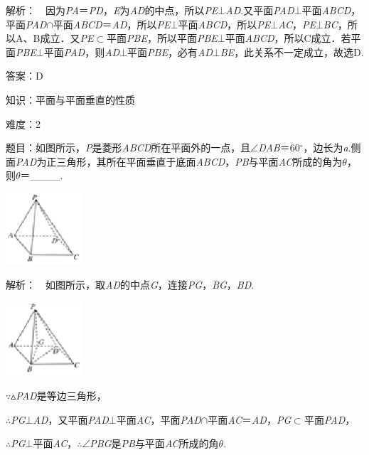 \documentclass{article} %
\begin{document}
解析：　因为\textit{PA}＝\textit{PD}，\textit{E}为\textit{AD}的中点，所以\textit{PE}$\mathrm{\bot}$\textit{AD}.又平面\textit{PAD}$\mathrm{\bot}$平面\textit{ABCD}，平面\textit{PAD}$\mathrm{\cap}$平面\textit{ABCD}＝\textit{AD}，所以\textit{PE}$\mathrm{\bot}$平面\textit{ABCD}，所以\textit{PE}$\mathrm{\bot}$\textit{AC}，\textit{PE}$\mathrm{\bot}$\textit{BC}，所以A、B成立．又\textit{PE}$\mathrm{\subset }$平面\textit{PBE}，所以平面\textit{PBE}$\mathrm{\bot}$平面\textit{ABCD}，所以C成立．若平面\textit{PBE}$\mathrm{\bot}$平面\textit{PAD}，则\textit{AD}$\mathrm{\bot}$平面\textit{PBE}，必有\textit{AD}$\mathrm{\bot}$\textit{BE}，此关系不一定成立，故选D.

答案：D

知识：平面与平面垂直的性质

难度：2

题目：如图所示，\textit{P}是菱形\textit{ABCD}所在平面外的一点，且$\mathrm{\angle}$\textit{DAB}＝60$\mathrm{{}^\circ}$，边长为\textit{a}.侧面\textit{PAD}为正三角形，其所在平面垂直于底面\textit{ABCD}，\textit{PB}与平面\textit{AC}所成的角为\textit{$\theta$}，则\textit{$\theta$}＝\_\_\_\_.

\includegraphics*[width=1.12in, height=1.06in, keepaspectratio=false]{image256}

解析：　如图所示，取\textit{AD}的中点\textit{G}，连接\textit{PG}，\textit{BG}，\textit{BD}.

\includegraphics*[width=1.12in, height=1.08in, keepaspectratio=false]{image257}

$\mathrm{\because}$$\mathrm{\vartriangle}$\textit{PAD}是等边三角形，

$\mathrm{\therefore}$\textit{PG}$\mathrm{\bot}$\textit{AD}，又平面\textit{PAD}$\mathrm{\bot}$平面\textit{AC}，平面\textit{PAD}$\mathrm{\cap}$平面\textit{AC}＝\textit{AD}，\textit{PG}$\mathrm{\subset }$平面\textit{PAD}，

$\mathrm{\therefore}$\textit{PG}$\mathrm{\bot}$平面\textit{AC}，$\mathrm{\therefore}$$\mathrm{\angle}$\textit{PBG}是\textit{PB}与平面\textit{AC}所成的角\textit{$\theta$}.
\end{document}
